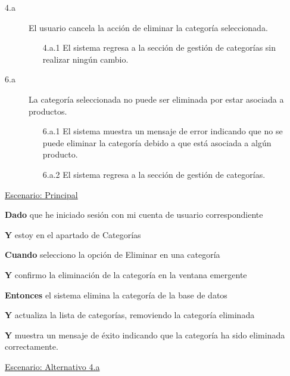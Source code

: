 \begin{description}
  
    \item[4.a] El usuario cancela la acción de eliminar la categoría seleccionada.
    \begin{enumerate}
        \item[4.a.1] El sistema regresa a la sección de gestión de categorías sin realizar ningún cambio.
    \end{enumerate}

     \item[6.a] La categoría seleccionada no puede ser eliminada por estar asociada a productos.
    \begin{enumerate}
        \item[6.a.1]  El sistema muestra un mensaje de error indicando que no se puede eliminar la categoría debido a que está asociada a algún producto.
        \item[6.a.2]  El sistema regresa a la sección de gestión de categorías.
    \end{enumerate}
\end{description}

\underline{Escenario: Principal}\par
\vspace{0.15cm}

\textbf{Dado} que he iniciado sesión con mi cuenta de usuario correspondiente\par
\textbf{Y} estoy en el apartado de Categorías\par
\textbf{Cuando} selecciono la opción de Eliminar en una categoría\par
\textbf{Y} confirmo la eliminación de la categoría en la ventana emergente\par
\textbf{Entonces} el sistema elimina la categoría de la base de datos\par
\textbf{Y} actualiza la lista de categorías, removiendo la categoría eliminada\par
\textbf{Y} muestra un mensaje de éxito indicando que la categoría ha sido eliminada correctamente.\par




\vspace{0.20cm}

\underline{Escenario: Alternativo 4.a}\par
\vspace{0.15cm}

